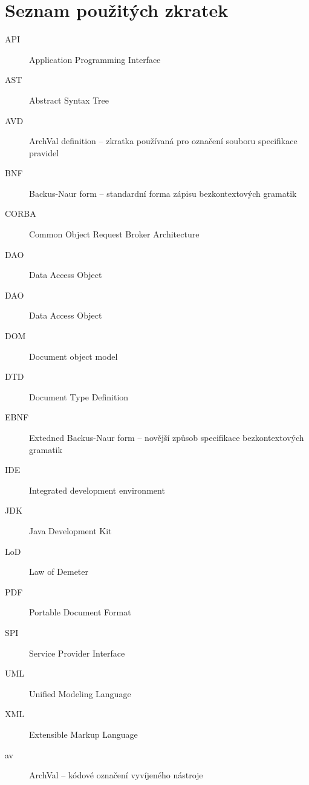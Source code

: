 \chapter{Seznam použitých zkratek}

\begin{description}
\item[API] Application Programming Interface
\item[AST] Abstract Syntax Tree
\item[AVD] ArchVal definition -- zkratka používaná pro označení souboru specifikace pravidel
\item[BNF] Backus-Naur form -- standardní forma zápisu bezkontextových gramatik
\item[CORBA] Common Object Request Broker Architecture
\item[DAO] Data Access Object
\item[DAO] Data Access Object
\item[DOM] Document object model
\item[DTD] Document Type Definition
\item[EBNF] Extedned Backus-Naur form -- novější způsob specifikace bezkontextových gramatik
\item[IDE] Integrated development environment
\item[JDK] Java Development Kit
\item[LoD] Law of Demeter
\item[PDF] Portable Document Format
\item[SPI] Service Provider Interface
\item[UML] Unified Modeling Language
\item[XML] Extensible Markup Language
\item[av] ArchVal -- kódové označení vyvíjeného nástroje
\end{description}
